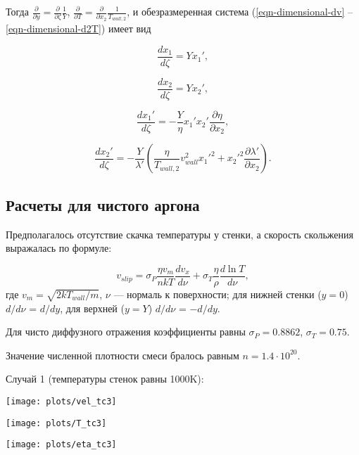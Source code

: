 \documentclass[12pt]{article}
\begin{document}
Тогда $\frac{\partial }{\partial y}=\frac{\partial }{\partial \zeta}\frac{1}{Y}$, $\frac{\partial }{\partial T}=\frac{\partial }{\partial x_{2}}\frac{1}{T_{wall,2}}$, и обезразмеренная система (\ref{eqn-dimensional-dv} -- \ref{eqn-dimensional-d2T}) имеет вид

\begin{equation}
  \frac{d x_{1}}{d \zeta} = Y x_{1}',\label{eqn-dimensionless-dx1}
\end{equation}

\begin{equation}
  \frac{d x_{2}}{d \zeta} = Y x_{2}',\label{eqn-dimensionless-dx2}
\end{equation}

\begin{equation}
  \frac{d x_{1}'}{d \zeta} = -\frac{Y}{\eta}x_{1}'x_{2}'\frac{\partial \eta}{\partial x_{2}},\label{eqn-dimensionless-dx21}
\end{equation}

\begin{equation}
  \frac{d x_{2}'}{d \zeta} = -\frac{Y}{\lambda'}\left(\frac{\eta}{T_{wall,2}}v_{wall}^{2}x_{1}'^2+x_{2}'^{2}\frac{\partial \lambda'}{\partial x_{2}} \right).
\end{equation}

\subsection{Расчеты для чистого аргона}
Предполагалось отсутствие скачка температуры у стенки, а скорость скольжения выражалась по формуле:

\begin{equation}
  v_{slip} = \sigma_{P} \frac{\eta v_{m}}{nkT}\frac{d v_{x}}{d \nu} + \sigma_{T}\frac{\eta}{\rho}\frac{d \ln T}{d \nu},
\end{equation}
где $v_{m} = \sqrt{2kT_{wall} / m}$, $\nu$ --- нормаль к поверхности; для нижней стенки ($y=0$) $d / d \nu$ = $d / d y$, для верхней ($y=Y$) $d / d \nu$ = $-d / d y$.

Для чисто диффузного отражения коэффициенты равны $\sigma_{P} = 0.8862$, $\sigma_{T} = 0.75$.

Значение численной плотности смеси бралось равным $n=1.4 \cdot 10^{20}$.

Случай 1 (температуры стенок равны 1000K):
\begin{center}
\texttt{[image: plots/vel\_tc3]}
\end{center}
\begin{center}
\texttt{[image: plots/T\_tc3]}
\end{center}
\begin{center}
\texttt{[image: plots/eta\_tc3]}
\end{center}
\end{document}

